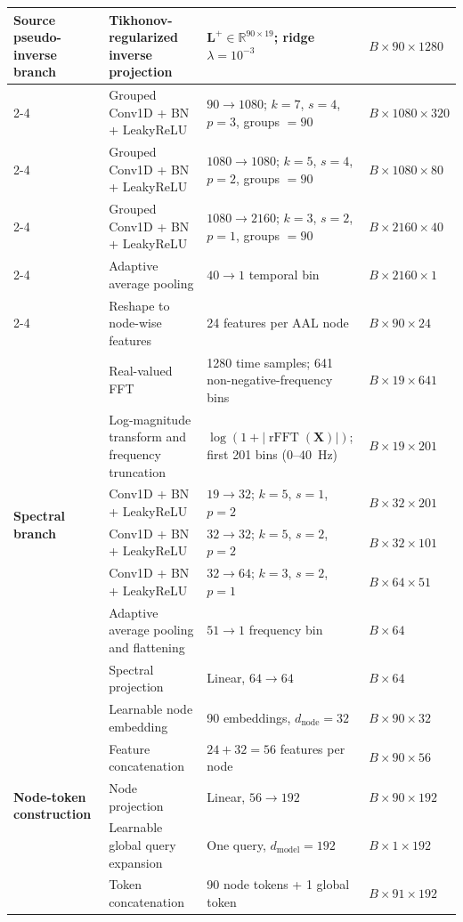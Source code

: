 \documentclass[11pt]{article}
\begin{document}
{\begin{longtable}{p{}p{}p{}p{}}
\multirow{6}{0.16\textwidth}{\textbf{Source pseudo-inverse branch}}
& Tikhonov-regularized inverse projection & $\mathbf{L}^{+}\in\mathbb{R}^{90\times19}$; ridge $\lambda=10^{-3}$ & $B\times90\times1280$ \\
\cmidrule(l){2-4}
& Grouped Conv1D + BN + LeakyReLU & $90\rightarrow1080$; $k=7$, $s=4$, $p=3$, groups $=90$ & $B\times1080\times320$ \\
\cmidrule(l){2-4}
& Grouped Conv1D + BN + LeakyReLU & $1080\rightarrow1080$; $k=5$, $s=4$, $p=2$, groups $=90$ & $B\times1080\times80$ \\
\cmidrule(l){2-4}
& Grouped Conv1D + BN + LeakyReLU & $1080\rightarrow2160$; $k=3$, $s=2$, $p=1$, groups $=90$ & $B\times2160\times40$ \\
\cmidrule(l){2-4}
& Adaptive average pooling & $40\rightarrow1$ temporal bin & $B\times2160\times1$ \\
\cmidrule(l){2-4}
& Reshape to node-wise features & 24 features per AAL node & $B\times90\times24$ \\
\midrule

\multirow{7}{0.16\textwidth}{\textbf{Spectral branch}}
& Real-valued FFT & 1280 time samples; 641 non-negative-frequency bins & $B\times19\times641$ \\
\cmidrule(l){2-4}
& Log-magnitude transform and frequency truncation & $\log(1+|\operatorname{rFFT}(\mathbf{X})|)$; first 201 bins ($0$--$40$~Hz) & $B\times19\times201$ \\
\cmidrule(l){2-4}
& Conv1D + BN + LeakyReLU & $19\rightarrow32$; $k=5$, $s=1$, $p=2$ & $B\times32\times201$ \\
\cmidrule(l){2-4}
& Conv1D + BN + LeakyReLU & $32\rightarrow32$; $k=5$, $s=2$, $p=2$ & $B\times32\times101$ \\
\cmidrule(l){2-4}
& Conv1D + BN + LeakyReLU & $32\rightarrow64$; $k=3$, $s=2$, $p=1$ & $B\times64\times51$ \\
\cmidrule(l){2-4}
& Adaptive average pooling and flattening & $51\rightarrow1$ frequency bin & $B\times64$ \\
\cmidrule(l){2-4}
& Spectral projection & Linear, $64\rightarrow64$ & $B\times64$ \\
\midrule

\multirow{5}{0.16\textwidth}{\textbf{Node-token construction}}
& Learnable node embedding & 90 embeddings, $d_{\mathrm{node}}=32$ & $B\times90\times32$ \\
\cmidrule(l){2-4}
& Feature concatenation & $24+32=56$ features per node & $B\times90\times56$ \\
\cmidrule(l){2-4}
& Node projection & Linear, $56\rightarrow192$ & $B\times90\times192$ \\
\cmidrule(l){2-4}
& Learnable global query expansion & One query, $d_{\mathrm{model}}=192$ & $B\times1\times192$ \\
\cmidrule(l){2-4}
& Token concatenation & 90 node tokens + 1 global token & $B\times91\times192$ \\
\midrule


\end{longtable}}
\end{document}
